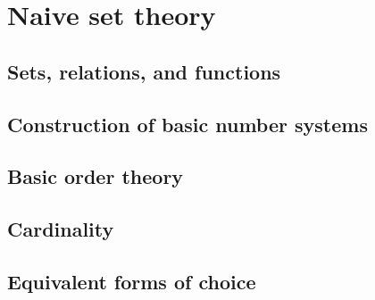 
\chapter{Naive set theory}

\section{Sets, relations, and functions}

\section{Construction of basic number systems}

\section{Basic order theory}

\section{Cardinality}

\section{Equivalent forms of choice}
